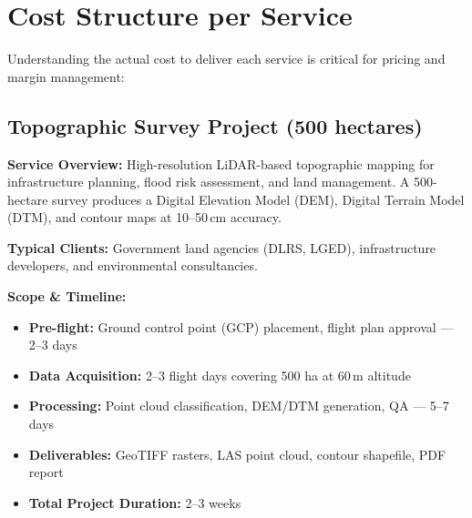 \section{Cost Structure per Service}

Understanding the actual cost to deliver each service is critical for pricing and margin management:

\subsection{Topographic Survey Project (500 hectares)}

\textbf{Service Overview:} High-resolution LiDAR-based topographic mapping for infrastructure planning, flood risk assessment, and land management. A 500-hectare survey produces a Digital Elevation Model (DEM), Digital Terrain Model (DTM), and contour maps at 10--50\,cm accuracy.

\textbf{Typical Clients:} Government land agencies (DLRS, LGED), infrastructure developers, and environmental consultancies.

\textbf{Scope \& Timeline:}
\begin{itemize}
    \item \textbf{Pre-flight:} Ground control point (GCP) placement, flight plan approval --- 2--3 days
    \item \textbf{Data Acquisition:} 2--3 flight days covering 500 ha at 60\,m altitude
    \item \textbf{Processing:} Point cloud classification, DEM/DTM generation, QA --- 5--7 days
    \item \textbf{Deliverables:} GeoTIFF rasters, LAS point cloud, contour shapefile, PDF report
    \item \textbf{Total Project Duration:} 2--3 weeks
\end{itemize}

